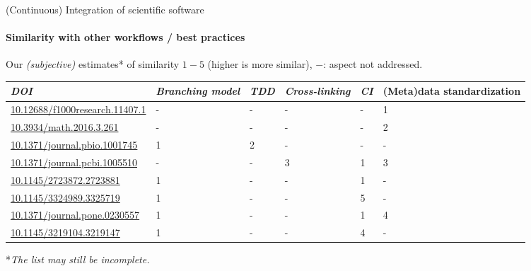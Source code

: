 \begin{frame}{(Continuous) Integration of scientific software} 
\framesubtitle{Similarity with other workflows / best practices}

	\vfill
	Our \emph{(subjective)} estimates* of similarity $1-5$ (higher is more similar), $-$: aspect not addressed.
	\begin{center}
		\scriptsize
		\begin{tabular}{@{} *6l @{}}    \toprule
				\emph{DOI} & \emph{Branching model} & \emph{TDD} & \emph{Cross-linking} & \emph{CI}  & (Meta)data standardization \\\midrule
				 \href{https://doi.org/10.12688/f1000research.11407.1}{10.12688/f1000research.11407.1} 
					 & -  & -  & -  & - & 1  \\ 
				 \href{https://doi.org/10.3934/math.2016.3.261}{10.3934/math.2016.3.261} 
					 & -  & -  & -  & - & 2  \\ 
				 \href{https://doi.org/10.1371/journal.pbio.1001745}{10.1371/journal.pbio.1001745} 
					 & 1  & 2  & -  & - & -  \\ 
				 \href{https://doi.org/10.1371/journal.pcbi.1005510}{10.1371/journal.pcbi.1005510}
					 & -  & -  & 3 & 1 & 3  \\ 
				 \href{https://doi.org/10.1145/2723872.2723881}{10.1145/2723872.2723881}
					 & 1  & -  & - & 1 & -  \\ 
				 \href{https://dl.acm.org/doi/10.1145/3324989.3325719}{10.1145/3324989.3325719}
					 & 1  & -  & - & 5 & -  \\ 
				 \href{https://doi.org/10.1371/journal.pone.0230557}{10.1371/journal.pone.0230557}
					 & 1  & -  & - & 1 & 4  \\ 
				 \href{https://doi.org/10.1145/3219104.3219147}{10.1145/3219104.3219147} 
					 & 1  & -  & -  & 4 & - \\\bottomrule
				 \hline
		\end{tabular}
	\end{center}
	
	*\emph{The list may still be incomplete.}
	
\end{frame}


